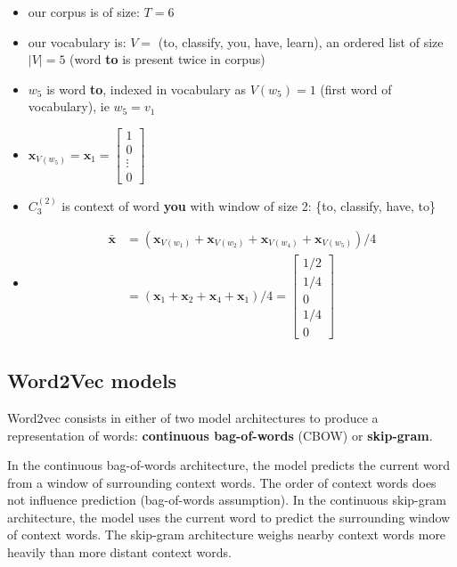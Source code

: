 \begin{itemize}
	\item our corpus is of size: $T=6$
	\item our vocabulary is: $V =$ (to, classify, you, have, learn), an ordered list of size $|V| = 5$ (word \textbf{to} is present twice in corpus)
	\item $w_5$ is word \textbf{to}, indexed in vocabulary as $V(w_5) = 1$ (first word of vocabulary), ie $w_5 = v_1$
	\item $\mathbf{x}_{V(w_5)} = \mathbf{x}_{1} = \begin{bmatrix} 
		1 \\
		0 \\
		\vdots\\
		0
	\end{bmatrix}$
	\item $C_3^{(2)}$ is context of word \textbf{you} with window of size 2: \{to, classify, have, to\}
	\item 
		\begin{align}
		\mathbf{\bar x} &= (\mathbf{x}_{V(w_1)} +\mathbf{x}_{V(w_2)} + \mathbf{x}_{V(w_4)} + \mathbf{x}_{V(w_5)}) / 4 \\ 
		&= (\mathbf{x}_{1} +\mathbf{x}_{2} + \mathbf{x}_{4} + \mathbf{x}_{1}) / 4 
		=\begin{bmatrix} 
			1/2 \\
			1/4 \\
			0\\
			1/4\\
			0
		\end{bmatrix}
	\end{align}
\end{itemize}


\subsection{Word2Vec models}

Word2vec consists in either of two model architectures to produce a representation of words: \textbf{continuous bag-of-words} (CBOW) or \textbf{skip-gram}. 

In the continuous bag-of-words architecture, the model predicts the current word from a window of surrounding context words. The order of context words does not influence prediction (bag-of-words assumption). In the continuous skip-gram architecture, the model uses the current word to predict the surrounding window of context words. 
The skip-gram architecture weighs nearby context words more heavily than more distant context words.

